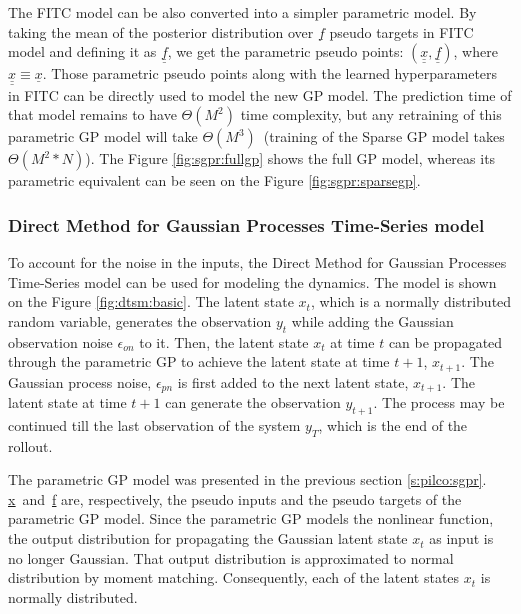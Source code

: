 \noindent The FITC model can be also converted into a simpler parametric model. By taking the mean of the posterior distribution over $\underline{f}$ pseudo targets in FITC model and defining it as $\underline{\underline{f}}$, we get the parametric pseudo points: $(\underline{\underline{x}}, \underline{\underline{f}})$, where $\underline{\underline{x}} \equiv \underline{x}$. Those parametric pseudo points along with the learned hyperparameters in FITC can be directly used to model the new GP model. The prediction time of that model remains to have $\Theta(M^2)$ time complexity, but any retraining of this parametric GP model will take $\Theta(M^3)$\ (training of the Sparse GP model takes $\Theta(M^2*N)$). The Figure \ref{fig:sgpr:fullgp} shows the full GP model, whereas its parametric equivalent can be seen on the Figure \ref{fig:sgpr:sparsegp}. 

\subsubsection{Direct Method for Gaussian Processes Time-Series model}
\label{s:pilco:ssm}

To account for the noise in the inputs, the Direct Method for Gaussian Processes Time-Series model \cite{mch-thesis} can be used for modeling the dynamics. The model is shown on the Figure \ref{fig:dtsm:basic}. The latent state $x_{t}$, which is a normally distributed random variable, generates the observation $y_{t}$ while adding the Gaussian observation noise $\epsilon_{on}$ to it. Then, the latent state $x_{t}$ at time $t$ can be propagated through the parametric GP to achieve the latent state at time $t+1$, $x_{t+1}$. The Gaussian process noise, $\epsilon_{pn}$ is first added to the next latent state, $x_{t+1}$. The latent state at time $t+1$ can generate the observation $y_{t+1}$. The process may be continued till the last observation of the system $y_{T}$, which is the end of the rollout. 

\noindent The parametric GP model was presented in the previous section \ref{s:pilco:sgpr}. \underline{\underline{x}}\ and\ \underline{\underline{f}} are, respectively, the pseudo inputs and the pseudo targets of the parametric GP model. Since the parametric GP models the nonlinear function, the output distribution for propagating the Gaussian latent state $x_{t}$ as input is no longer Gaussian. That output distribution is approximated to normal distribution by moment matching. Consequently, each of the latent states $x_{t}$ is normally distributed.

